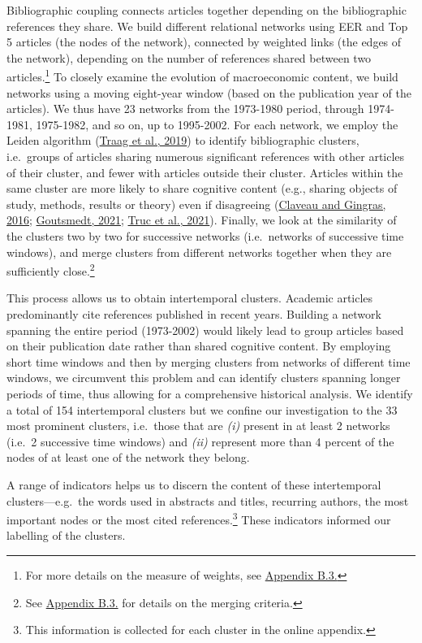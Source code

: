\documentclass[
  12pt,
  onecolumn]{article}
\begin{document}
Bibliographic coupling connects articles together depending on the bibliographic references they share. We build different relational networks using EER and Top 5 articles (the nodes of the network), connected by weighted links (the edges of the network), depending on the number of references shared between two articles.\footnote{For more details on the measure of weights, see \protect\hyperlink{network}{Appendix B.3.}} To closely examine the evolution of macroeconomic content, we build networks using a moving eight-year window (based on the publication year of the articles). We thus have 23 networks from the 1973-1980 period, through 1974-1981, 1975-1982, and so on, up to 1995-2002. For each network, we employ the Leiden algorithm (\protect\hyperlink{ref-traag2019}{Traag et al., 2019}) to identify bibliographic clusters, i.e.~groups of articles sharing numerous significant references with other articles of their cluster, and fewer with articles outside their cluster. Articles within the same cluster are more likely to share cognitive content (e.g., sharing objects of study, methods, results or theory) even if disagreeing (\protect\hyperlink{ref-claveau2016}{Claveau and Gingras, 2016}; \protect\hyperlink{ref-goutsmedt2021b}{Goutsmedt, 2021}; \protect\hyperlink{ref-truc2021}{Truc et al., 2021}). Finally, we look at the similarity of the clusters two by two for successive networks (i.e.~networks of successive time windows), and merge clusters from different networks together when they are sufficiently close.\footnote{See \protect\hyperlink{network}{Appendix B.3.} for details on the merging criteria.}

This process allows us to obtain intertemporal clusters. Academic articles predominantly cite references published in recent years. Building a network spanning the entire period (1973-2002) would likely lead to group articles based on their publication date rather than shared cognitive content. By employing short time windows and then by merging clusters from networks of different time windows, we circumvent this problem and can identify clusters spanning longer periods of time, thus allowing for a comprehensive historical analysis. We identify a total of 154 intertemporal clusters but we confine our investigation to the 33 most prominent clusters, i.e.~those that are \emph{(i)} present in at least 2 networks (i.e.~2 successive time windows) and \emph{(ii)} represent more than 4 percent of the nodes of at least one of the network they belong.

A range of indicators helps us to discern the content of these intertemporal clusters---e.g.~the words used in abstracts and titles, recurring authors, the most important nodes or the most cited references.\footnote{This information is collected for each cluster in the online appendix.} These indicators informed our labelling of the clusters.
\end{document}
